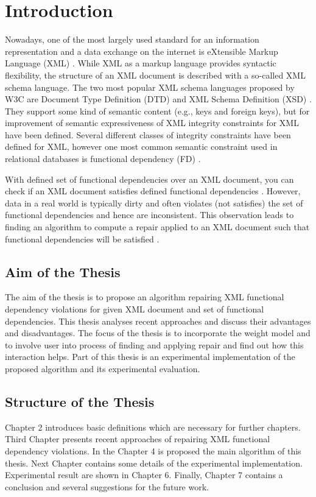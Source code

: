 \chapter{Introduction}

Nowadays, one of the most largely used standard for an information representation and a data exchange on the internet is eXtensible Markup Language (XML) \cite{xml}. While XML as a markup language provides syntactic flexibility, the structure of an XML document is described with a so-called XML schema language. The two most popular XML schema languages proposed by W3C are Document Type Definition (DTD) \cite{xml} and XML Schema Definition (XSD) \cite{xsd1,xsd2,xsd3}. They support some kind of semantic content (e.g., keys and foreign keys), but for improvement of semantic expressiveness of XML integrity constraints for XML \cite{ic} have been defined. Several different classes of integrity constraints have been defined for XML, however one most common semantic constraint used in relational databases is functional dependency (FD) \cite{fd}.

With defined set of functional dependencies over an XML document, you can check if an XML document satisfies defined functional dependencies \cite{satifFD}. However, data in a real world is typically dirty and often violates (not satisfies) the set of functional dependencies and hence are inconsistent. This observation leads to finding an algorithm to compute a repair applied to an XML document such that functional dependencies will be satisfied \cite{RepAndConsistentAnswer, QueryXML, ImprovingXML}.

\section{Aim of the Thesis}

The aim of the thesis is to propose an algorithm repairing XML functional dependency violations for given XML document and set of functional dependencies. This thesis analyses recent approaches and discuss their advantages and disadvantages. The focus of the thesis is to incorporate the weight model and to involve user into process of finding and applying repair and find out how this interaction helps. Part of this thesis is an experimental implementation of the proposed algorithm and its experimental evaluation.

\section{Structure of the Thesis}

Chapter 2 introduces basic definitions which are necessary for further chapters. Third Chapter presents recent approaches of repairing XML functional dependency violations. In the Chapter 4 is proposed the main algorithm of this thesis. Next Chapter contains some details of the experimental implementation. Experimental result are shown in Chapter 6. Finally, Chapter 7 contains a conclusion and several suggestions for the future work.
